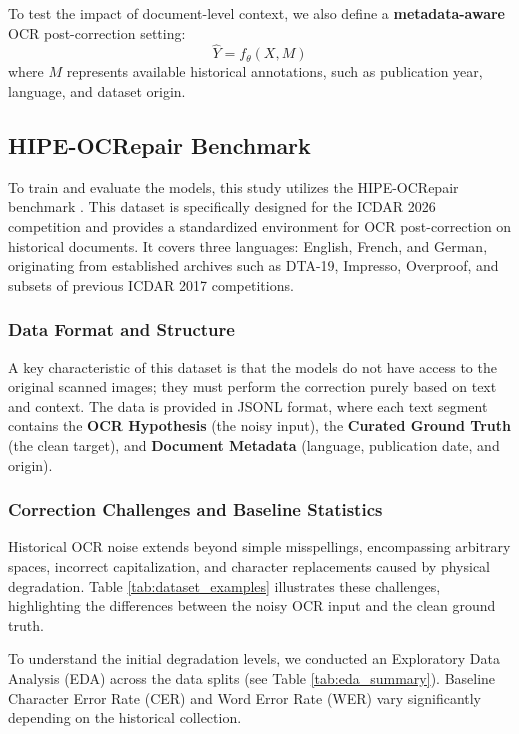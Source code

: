 \documentclass[11pt]{extarticle}
\begin{document}
To test the impact of document-level context, we also define a \textbf{metadata-aware} OCR post-correction setting:
\begin{equation}
    \hat{Y} = f_{\theta}(X, M)
\end{equation}
where $M$ represents available historical annotations, such as publication year, language, and dataset origin. 


\subsection{HIPE-OCRepair Benchmark}
To train and evaluate the models, this study utilizes the HIPE-OCRepair benchmark \cite{hipe_ocrepair_2026}. This dataset is specifically designed for the ICDAR 2026 competition and provides a standardized environment for OCR post-correction on historical documents. It covers three languages: English, French, and German, originating from established archives such as DTA-19, Impresso, Overproof, and subsets of previous ICDAR 2017 competitions.

\subsubsection{Data Format and Structure}
A key characteristic of this dataset is that the models do not have access to the original scanned images; they must perform the correction purely based on text and context. The data is provided in JSONL format, where each text segment contains the \textbf{OCR Hypothesis} (the noisy input), the \textbf{Curated Ground Truth} (the clean target), and \textbf{Document Metadata} (language, publication date, and origin).

\subsubsection{Correction Challenges and Baseline Statistics}
Historical OCR noise extends beyond simple misspellings, encompassing arbitrary spaces, incorrect capitalization, and character replacements caused by physical degradation. Table \ref{tab:dataset_examples} illustrates these challenges, highlighting the differences between the noisy OCR input and the clean ground truth. 

To understand the initial degradation levels, we conducted an Exploratory Data Analysis (EDA) across the data splits (see Table \ref{tab:eda_summary}). Baseline Character Error Rate (CER) and Word Error Rate (WER) vary significantly depending on the historical collection. 
\end{document}
